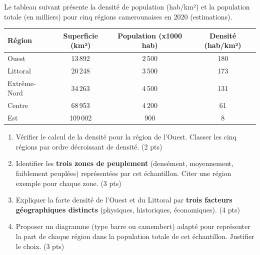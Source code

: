 \documentclass[11pt]{article}
\begin{document}
\begin{exercice}
\label{exo:densites}
Le tableau suivant présente la densité de population (hab/km²) et la population totale (en milliers) pour cinq régions camerounaises en 2020 (estimations).

\begin{center}
\begin{tabular}{|l|c|c|c|}
\hline
\textbf{Région} & \textbf{Superficie (km²)} & \textbf{Population (x1000 hab)} & \textbf{Densité (hab/km²)} \\
\hline
Ouest & 13\,892 & 2\,500 & 180 \\
Littoral & 20\,248 & 3\,500 & 173 \\
Extrême-Nord & 34\,263 & 4\,500 & 131 \\
Centre & 68\,953 & 4\,200 & 61 \\
Est & 109\,002 & 900 & 8 \\
\hline
\end{tabular}
\end{center}

\begin{enumerate}
    \item Vérifier le calcul de la densité pour la région de l'Ouest. Classer les cinq régions par ordre décroissant de densité. \hfill (2 pts)
    \item Identifier les \textbf{trois zones de peuplement} (densément, moyennement, faiblement peuplées) représentées par cet échantillon. Citer une région exemple pour chaque zone. \hfill (3 pts)
    \item Expliquer la forte densité de l'Ouest et du Littoral par \textbf{trois facteurs géographiques distincts} (physiques, historiques, économiques). \hfill (4 pts)
    \item Proposer un diagramme (type barre ou camembert) adapté pour représenter la part de chaque région dans la population totale de cet échantillon. Justifier le choix. \hfill (3 pts)
\end{enumerate}
\end{exercice}
\end{document}
